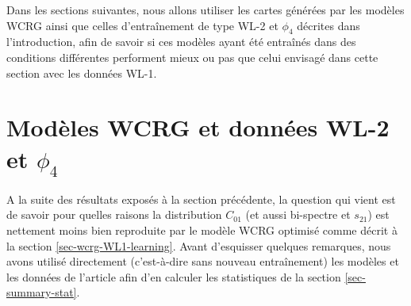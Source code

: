 \documentclass[12pt,twoside]{article}
\begin{document}
Dans les sections suivantes, nous allons utiliser les cartes générées par les modèles WCRG ainsi que celles d'entraînement de type WL-2 et $\phi_4$ décrites dans l'introduction, afin de savoir si ces modèles ayant été entraînés dans des conditions différentes performent mieux ou pas que celui envisagé dans cette section avec les données WL-1. 
%
\section{Modèles WCRG et données WL-2 et $\phi_4$}
\label{sec:WL2_Phi4}
%
A la suite des résultats exposés à la section précédente, la question qui vient est de savoir pour quelles raisons la distribution $C_{01}$ (et aussi bi-spectre et $s_{21}$) est nettement moins bien reproduite par le modèle WCRG optimisé comme décrit à la section \ref{sec-wcrg-WL1-learning}. Avant d'esquisser quelques remarques, nous avons utilisé directement (c'est-à-dire sans nouveau entraînement) les modèles et les données de l'article \cite{2023arXiv230600181G} afin d'en calculer les statistiques de la section \ref{sec-summary-stat}.
\end{document}
